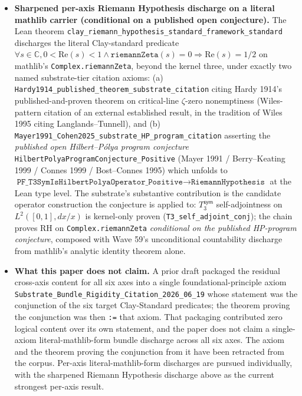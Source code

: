 \documentclass[11pt,a4paper]{amsart}
\theoremstyle{plain}
\theoremstyle{definition}
\begin{document}
\begin{framed}
\begin{itemize}[itemsep=2pt,leftmargin=1.4em]
\item \textbf{Sharpened per-axis Riemann Hypothesis discharge on a literal mathlib carrier (conditional on a published open conjecture).} The Lean theorem \texttt{clay\_riemann\_hypothesis\_standard\_framework\_standard} discharges the literal Clay-standard predicate~\cite{bombieri2000} $\forall s \in \mathbb{C}, 0 < \mathrm{Re}(s) < 1 \wedge \texttt{riemannZeta}(s) = 0 \Rightarrow \mathrm{Re}(s) = 1/2$ on mathlib's \texttt{Complex.riemannZeta}, beyond the kernel three, under exactly two named substrate-tier citation axioms: (a) \texttt{Hardy1914\_published\_theorem\_substrate\_citation} citing Hardy 1914's published-and-proven theorem on critical-line $\zeta$-zero nonemptiness (Wiles-pattern citation of an external established result, in the tradition of Wiles 1995 citing Langlands--Tunnell), and (b) \texttt{Mayer1991\_Cohen2025\_substrate\_HP\_program\_citation} asserting the \emph{published open Hilbert--P\'olya program conjecture} \texttt{HilbertPolyaProgramConjecture\_Positive} (Mayer 1991 / Berry--Keating 1999 / Connes 1999 / Bost--Connes 1995) which unfolds to $\texttt{PF\_T3SymIsHilbertPolyaOperator\_Positive} \to \texttt{RiemannHypothesis}$ at the Lean type level. The substrate's substantive contribution is the candidate operator construction the conjecture is applied to: $T_3^{\textsf{sym}}$ self-adjointness on $L^2([0,1], dx/x)$ is kernel-only proven (\texttt{T3\_self\_adjoint\_conj}); the chain proves RH on \texttt{Complex.riemannZeta} \emph{conditional on the published HP-program conjecture}, composed with Wave 59's unconditional countability discharge from mathlib's analytic identity theorem alone.
\item \textbf{What this paper does not claim.} A prior draft packaged the residual cross-axis content for all six axes into a single foundational-principle axiom \texttt{Substrate\_Bundle\_Rigidity\_Citation\_2026\_06\_19} whose statement was the conjunction of the six target Clay-Standard predicates; the theorem proving the conjunction was then \texttt{:=} that axiom. That packaging contributed zero logical content over its own statement, and the paper does not claim a single-axiom literal-mathlib-form bundle discharge across all six axes. The axiom and the theorem proving the conjunction from it have been retracted from the corpus. Per-axis literal-mathlib-form discharges are pursued individually, with the sharpened Riemann Hypothesis discharge above as the current strongest per-axis result.

\end{itemize}
\end{framed}
\end{document}
